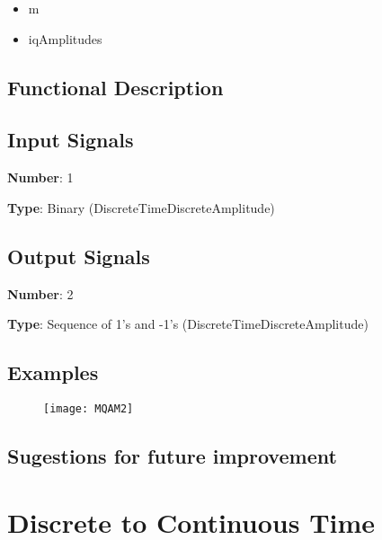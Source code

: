 \documentclass[a4paper]{article}
\begin{document}
\begin{itemize}
	\item m 
	\item iqAmplitudes 
\end{itemize}

\subsection*{Functional Description}



\subsection*{Input Signals}

\textbf{Number}: 1

\textbf{Type}: Binary (DiscreteTimeDiscreteAmplitude)

\subsection*{Output Signals}

\textbf{Number}: 2

\textbf{Type}: Sequence of 1's and -1's (DiscreteTimeDiscreteAmplitude)

\subsection*{Examples}

\begin{figure}[h]
	\texttt{[image: MQAM2]}
\end{figure}

\subsection*{Sugestions for future improvement}

\pagebreak


\section*{Discrete to Continuous Time}
\end{document}
